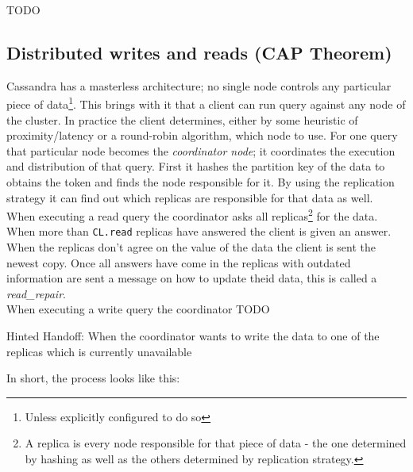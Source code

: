 TODO

\subsection{Distributed writes and reads (CAP Theorem)}

Cassandra has a masterless architecture; no single node controls any particular piece of data\footnote{Unless explicitly configured to do so}. This brings with it that a client can run query against any node of the cluster. In practice the client determines, either by some heuristic of proximity/latency or a round-robin algorithm, which node to use.
For one query that particular node becomes the \textit{coordinator node}; it coordinates the execution and distribution of that query.
First it hashes the partition key of the data to obtains the token and finds the node responsible for it. By using the replication strategy it can find out which replicas are responsible for that data as well. \\
When executing a read query the coordinator asks all replicas\footnote{A replica is every node responsible for that piece of data - the one determined by hashing as well as the others determined by replication strategy.} for the data. When more than \texttt{CL.read} replicas have answered the client is given an answer. When the replicas don't agree on the value of the data the client is sent the newest copy. Once all answers have come in the replicas with outdated information are sent a message on how to update theid data, this is called a \textit{read\_repair}. \\
When executing a write query the coordinator  TODO

Hinted Handoff: When the coordinator wants to write the data to one of the replicas which is currently unavailable

In short, the process looks like this:

